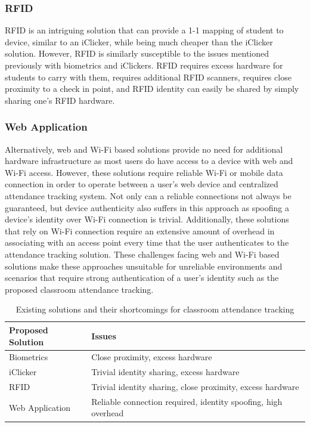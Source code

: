 \subsubsection{RFID}

RFID is an intriguing solution that can provide a 1-1 mapping of student to
device, similar to an iClicker, while being much cheaper than the iClicker
solution. However, RFID is similarly susceptible to the issues mentioned
previously with biometrics and iClickers. RFID requires excess hardware for
students to carry with them, requires additional RFID scanners, requires close
proximity to a check in point, and RFID identity can easily be shared by simply
sharing one’s RFID hardware.

\subsubsection{Web Application}

Alternatively, web and Wi-Fi based solutions provide no need for additional
hardware infrastructure as most users do have access to a device with web and
Wi-Fi access. However, these solutions require reliable Wi-Fi or mobile data
connection in order to operate between a user's web device and centralized
attendance tracking system. Not only can a reliable connections not always be
guaranteed, but device authenticity also suffers in this approach as spoofing a
device’s identity over Wi-Fi connection is trivial. Additionally, these
solutions that rely on Wi-Fi connection require an extensive amount of overhead
in associating with an access point every time that the user authenticates to
the attendance tracking solution. These challenges facing web and Wi-Fi based
solutions make these approaches unsuitable for unreliable environments and
scenarios that require strong authentication of a user’s identity such as the
proposed classroom attendance tracking.

\begin{table} \centering \begin{tabularx}{\columnwidth}{lX} \toprule Proposed
Solution & Issues \\ \midrule Biometrics & Close proximity, excess hardware \\
iClicker & Trivial identity sharing, excess hardware \\ RFID & Trivial identity
sharing, close proximity, excess hardware \\ Web Application & Reliable
connection required, identity spoofing, high overhead \\ \bottomrule
\end{tabularx} \caption{Existing solutions and their shortcomings for classroom
attendance tracking} \label{tab:existing-solutions} \end{table}


